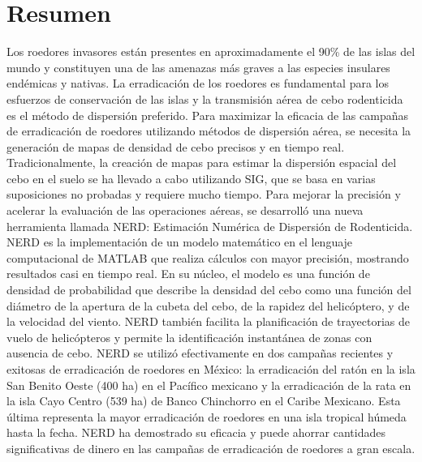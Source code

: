 \section{Resumen}
Los roedores invasores están presentes en aproximadamente el 90\% de las islas del mundo y constituyen una de las amenazas más graves a las especies insulares endémicas y nativas. La erradicación de los roedores es fundamental para los esfuerzos de conservación de las islas y la transmisión aérea de cebo rodenticida es el método de dispersión preferido. Para maximizar la eficacia de las campañas de erradicación de roedores utilizando métodos de dispersión aérea, se necesita la generación de mapas de densidad de cebo precisos y en tiempo real. Tradicionalmente, la creación de mapas para estimar la dispersión espacial del cebo en el suelo se ha llevado a cabo utilizando SIG, que se basa en varias suposiciones no probadas y requiere mucho tiempo. Para mejorar la precisión y acelerar la evaluación de las operaciones aéreas, se desarrolló una nueva herramienta llamada NERD: Estimación Numérica de Dispersión de Rodenticida. NERD es la implementación de un modelo matemático en el lenguaje computacional de MATLAB que realiza cálculos con mayor precisión, mostrando resultados casi en tiempo real. En su núcleo, el modelo es una función de densidad de probabilidad que describe la densidad del cebo como una función del diámetro de la apertura de la cubeta del cebo, de la rapidez del helicóptero, y de la velocidad del viento. NERD también facilita la planificación de trayectorias de vuelo de helicópteros y permite la identificación instantánea de zonas con ausencia de cebo. NERD se utilizó efectivamente en dos campañas recientes y exitosas de erradicación de roedores en México: la erradicación del ratón en la isla San Benito Oeste (400 ha) en el Pacífico mexicano y la erradicación de la rata en la isla Cayo Centro (539 ha) de Banco Chinchorro en el Caribe Mexicano. Esta última representa la mayor erradicación de roedores en una isla tropical húmeda hasta la fecha. NERD ha demostrado su eficacia y puede ahorrar cantidades significativas de dinero en las campañas de erradicación de roedores a gran escala.
